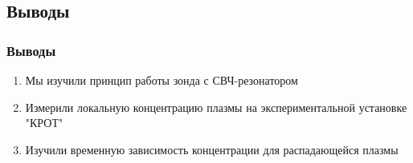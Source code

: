 \documentclass[10pt,pdf,hyperref={unicode}, dvipsnames]{beamer}
\begin{document}

\subsection{Выводы}
\begin{frame}
		\vfill
		\frametitle{Выводы}
		\begin{enumerate}
			\item Мы изучили принцип работы зонда с СВЧ-резонатором

			\item Измерили локальную концентрацию плазмы на экспериментальной установке "КРОТ"

			\item Изучили временную зависимость концентрации для распадающейся плазмы  

		\end{enumerate}
		\vfill
\end{frame}
\end{document}
